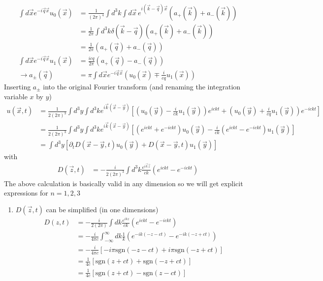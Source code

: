 \documentclass[10pt,a4paper]{book}
\theoremstyle{definition}
\begin{document}
\begin{itemize}
\begin{align}
\int d\vec{x}e^{-i\vec{q}\vec{x}}u_0(\vec{x})&=\frac{1}{(2\pi)^4}\int d^3k\int d\vec{x}\, e^{i(\vec{k}-\vec{q})\vec{x}}\left(a_+(\vec{k})+a_-(\vec{k})\right)\\
&=\frac{1}{2\pi}\int d^3k \delta(\vec{k}-\vec{q})\left(a_+(\vec{k})+a_-(\vec{k})\right)\\
&=\frac{1}{2\pi}\left(a_+(\vec{q})+a_-(\vec{q})\right)\\
\int d\vec{x}e^{-i\vec{q}\vec{x}}u_1(\vec{x})
&=\frac{icq}{2\pi}\left(a_+(\vec{q})-a_-(\vec{q})\right)\\
\rightarrow
a_\pm(\vec{q})&=\pi\int d\vec{x}e^{-i\vec{q}\vec{x}}\left(u_0(\vec{x})\mp\frac{i}{cq}u_1(\vec{x})\right)
\end{align}
Inserting $a_\pm$ into the original Fourier transform (and renaming the integration variable $x$ by $y$)
\begin{align}
u(\vec{x},t)
&=\frac{1}{2(2\pi)^3}\int d^3y\int d^3ke^{i\vec{k}(\vec{x}-\vec{y})} \left[\left(u_0(\vec{y})-\frac{i}{ck}u_1(\vec{y})\right)e^{ickt}+\left(u_0(\vec{y})+\frac{i}{cq}u_1(\vec{y})\right)e^{-ickt}\right]\\
&=\frac{1}{2(2\pi)^3}\int d^3y\int d^3ke^{i\vec{k}(\vec{x}-\vec{y})}\left[\left(e^{ickt}+e^{-ickt}\right) u_0(\vec{y})-\frac{i}{ck}\left(e^{ickt}-e^{-ickt}\right)u_1(\vec{y})\right]\\
&=\int d^3y\left[ \partial_t D(\vec{x}-\vec{y},t)u_0(\vec{y})+D(\vec{x}-\vec{y},t)u_1(\vec{y})\right]
\end{align}
with
\begin{align}
D(\vec{z},t)&=-\frac{i}{2(2\pi)^3}\int d^3k\frac{e^{i\vec{k}\vec{z}}}{ck}(e^{ickt}-e^{-ickt})
\end{align}
The above calculation is basically valid in any dimension so we will get explicit expressions for $n=1,2,3$
\begin{enumerate}
\item $D(\vec{z},t)$ can be simplified (in one dimensions)
\begin{align}
D(z,t)&=-\frac{i}{2(2\pi)}\int dk\frac{e^{ikz}}{ck}(e^{ickt}-e^{-ickt})\\
&=-\frac{i}{4\pi c}\int_{-\infty}^\infty dk\frac{1}{k}\left(e^{-ik(-z-ct)}-e^{-ik(-z+ct)}\right)\\
&=-\frac{i}{4\pi c}\left[-i\pi\text{sgn}(-z-ct)+i\pi\text{sgn}(-z+ct)\right]\\
&=\frac{1}{4 c}\left[\text{sgn}(z+ct)+\text{sgn}(-z+ct)\right]\\
&=\frac{1}{4 c}\left[\text{sgn}(z+ct)-\text{sgn}(z-ct)\right]\\

\end{align}
\end{enumerate}
\end{itemize}
\end{document}
